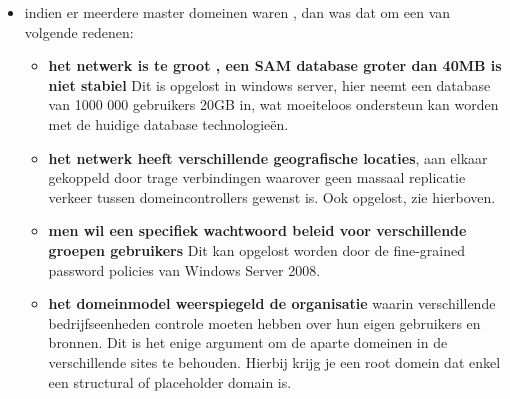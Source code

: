 \begin{itemize}
\item indien er meerdere master domeinen waren , dan was dat om een van volgende redenen:
\begin{itemize}
\item \textbf{het netwerk is te groot , een SAM database groter dan 40MB is niet stabiel}
Dit is opgelost in windows server, hier neemt een database van 1000 000 gebruikers 20GB in, wat moeiteloos ondersteun kan worden met de huidige database technologie\"en. 
	
\item \textbf{het netwerk heeft verschillende geografische locaties}, aan elkaar gekoppeld door trage verbindingen waarover geen massaal replicatie verkeer tussen domeincontrollers gewenst is. Ook opgelost, zie hierboven.

\item \textbf{men wil een specifiek wachtwoord beleid voor verschillende groepen gebruikers} Dit kan opgelost worden door de fine-grained password policies van Windows Server 2008.

\item \textbf{het domeinmodel weerspiegeld de organisatie} waarin verschillende bedrijfseenheden controle moeten hebben over hun eigen gebruikers en bronnen. Dit is het enige argument om de aparte domeinen in de verschillende sites te behouden. Hierbij krijg je een root domein dat enkel een structural of placeholder domain is.
\end{itemize}
\end{itemize}